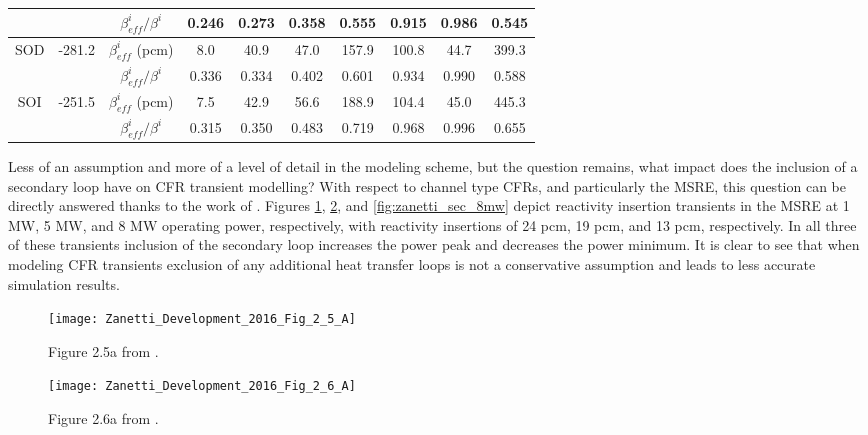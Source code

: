 \documentclass[review]{elsarticle}
\begin{document}
\begin{table}[h]
\begin{center}
\begin{tabular}{|c|c|c|c|c|c|c|c|c|c|}
            & & $\beta_{eff}^{i}/\beta^{i}$ & 0.246 & 0.273 & 0.358 & 0.555 &
                0.915 & 0.986 & 0.545 \\
            \hline
            SOD & -281.2 & $\beta_{eff}^{i}$ (pcm) & 8.0 & 40.9 & 47.0 & 157.9 &
                100.8 & 44.7 & 399.3 \\
            & & $\beta_{eff}^{i}/\beta^{i}$ & 0.336 & 0.334 & 0.402 & 0.601 &
                0.934 & 0.990 & 0.588 \\
            \hline
            SOI & -251.5 & $\beta_{eff}^{i}$ (pcm) & 7.5 & 42.9 & 56.6 & 188.9 &
                104.4 & 45.0 & 445.3 \\
            & & $\beta_{eff}^{i}/\beta^{i}$ & 0.315 & 0.350 & 0.483 & 0.719 &
                0.968 & 0.996 & 0.655 \\
            \hline
        \end{tabular}
    \end{center}
\end{table}

\par Less of an assumption and more of a level of detail in the modeling scheme,
but the question remains, what impact does the inclusion of a secondary loop
have on CFR transient modelling? With respect to channel type CFRs, and
particularly the MSRE, this question can be directly answered thanks to the work
of \cite{zanetti_development_2016}. Figures \ref{fig:zanetti_sec_1mw},
\ref{fig:zanetti_sec_5mw}, and \ref{fig:zanetti_sec_8mw} 
depict reactivity insertion
transients in the MSRE at 1 MW, 5 MW, and 8 MW operating power, respectively,
with reactivity insertions of 24 pcm, 19 pcm, and 13 pcm,
respectively. In all three of these transients inclusion of the secondary loop
increases the power peak and decreases the power minimum. It is clear to see
that when modeling CFR transients exclusion of any additional heat transfer
loops is not a conservative assumption and leads to less accurate simulation
results.

\begin{figure}[h]
   \centering
   \texttt{[image: Zanetti\_Development\_2016\_Fig\_2\_5\_A]}
   \caption{Figure 2.5a from \cite{zanetti_development_2016}.} 
   \label{fig:zanetti_sec_1mw}
\end{figure}

\begin{figure}[h]
   \centering
   \texttt{[image: Zanetti\_Development\_2016\_Fig\_2\_6\_A]}
   \caption{Figure 2.6a from \cite{zanetti_development_2016}.} 
   \label{fig:zanetti_sec_5mw}
\end{figure}
\end{document}
